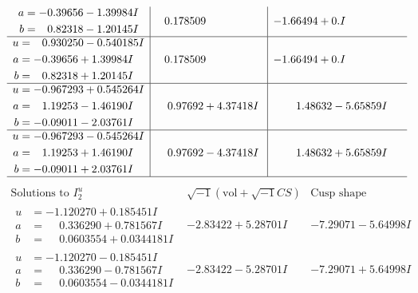 \documentclass[1p]{elsarticle_modified}
\theoremstyle{definition}
\newcommand{\I}{\sqrt{-1}}
\begin{document}
$$\begin{array}{c|c|c}
\begin{aligned}
a &= -0.39656 - 1.39984 I \\
b &= \phantom{-}0.82318 - 1.20145 I\end{aligned}
 & \phantom{-}0.178509\phantom{ +0.000000I} & -1.66494 + 0. I\phantom{ +0.000000I} \\ \hline\begin{aligned}
u &= \phantom{-}0.930250 - 0.540185 I \\
a &= -0.39656 + 1.39984 I \\
b &= \phantom{-}0.82318 + 1.20145 I\end{aligned}
 & \phantom{-}0.178509\phantom{ +0.000000I} & -1.66494 + 0. I\phantom{ +0.000000I} \\ \hline\begin{aligned}
u &= -0.967293 + 0.545264 I \\
a &= \phantom{-}1.19253 - 1.46190 I \\
b &= -0.09011 - 2.03761 I\end{aligned}
 & \phantom{-}0.97692 + 4.37418 I & \phantom{-}1.48632 - 5.65859 I \\ \hline\begin{aligned}
u &= -0.967293 - 0.545264 I \\
a &= \phantom{-}1.19253 + 1.46190 I \\
b &= -0.09011 + 2.03761 I\end{aligned}
 & \phantom{-}0.97692 - 4.37418 I & \phantom{-}1.48632 + 5.65859 I\\
 \hline 
 \end{array}$$\newpage$$\begin{array}{c|c|c}  
\text{Solutions to }I^u_{2}& \I (\text{vol} + \sqrt{-1}CS) & \text{Cusp shape}\\
 \hline 
\begin{aligned}
u &= -1.120270 + 0.185451 I \\
a &= \phantom{-}0.336290 + 0.781567 I \\
b &= \phantom{-}0.0603554 + 0.0344181 I\end{aligned}
 & -2.83422 + 5.28701 I & -7.29071 - 5.64998 I \\ \hline\begin{aligned}
u &= -1.120270 - 0.185451 I \\
a &= \phantom{-}0.336290 - 0.781567 I \\
b &= \phantom{-}0.0603554 - 0.0344181 I\end{aligned}
 & -2.83422 - 5.28701 I & -7.29071 + 5.64998 I \\ \hline\begin{aligned}

\end{aligned}
\end{array}$$
\end{document}
